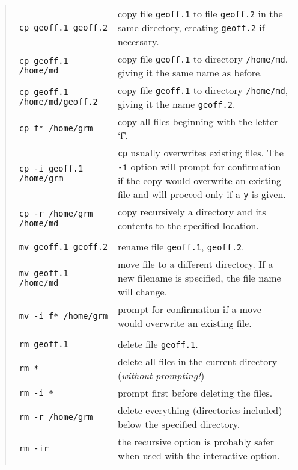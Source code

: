 \begin{quote}
\begin{tabular}{lp{3.5in}}

{\tt cp geoff.1 geoff.2} & copy file {\tt geoff.1} to file {\tt geoff.2}
             in the same directory, creating {\tt geoff.2} if necessary. \\

{\tt cp geoff.1 /home/md} & copy file {\tt geoff.1} to directory
            {\tt /home/md}, giving it the same name as before. \\

{\tt cp geoff.1 /home/md/geoff.2} & copy file {\tt geoff.1} to directory
            {\tt /home/md}, giving it the name {\tt geoff.2}. \\

{\tt cp f* /home/grm} & copy all files beginning with the letter `f'.\\

{\tt cp -i geoff.1 /home/grm} & {\tt cp} usually overwrites existing files.
              The {\tt -i} option will prompt for confirmation if the copy 
              would overwrite an existing file and will proceed only if a
              {\tt y} is given. \\

{\tt cp -r /home/grm /home/md} & copy recursively a directory
                             and its contents to the specified location. \\
\\
{\tt mv geoff.1 geoff.2} & rename file {\tt geoff.1}, {\tt geoff.2}.\\

{\tt mv geoff.1 /home/md} & move file to a different directory. If a
                     new filename is specified, the file name will change. \\

{\tt mv -i f* /home/grm} & prompt for confirmation if a move would overwrite
                  an existing file. \\
\\
{\tt rm geoff.1} &  delete file {\tt geoff.1}.  \\

{\tt rm *} &  delete all files in the current directory ({\it without 
                 prompting!}) \\

{\tt rm -i *} & prompt first before deleting the files.\\

{\tt rm -r /home/grm} & delete everything (directories included) below
                      the specified directory. \\

{\tt rm -ir} & the recursive option is probably safer when used with the
               interactive option.

\end{tabular}
\end{quote}

